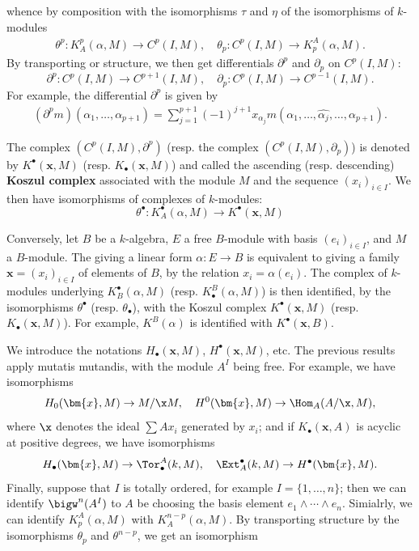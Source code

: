 whence by composition with the isomorphisms $\tau$ and $\eta$ of the isomorphisms of $k$-modules
\begin{align*}
\theta^p:K_A^p(\alpha,M)\to C^p(I,M),\quad \theta_p:C^p(I,M)\to K_p^A(\alpha,M).
\end{align*}
By transporting or structure, we then get differentials $\partial^p$ and $\partial_p$ on $C^p(I,M)$:
\[\partial^p:C^p(I,M)\to C^{p+1}(I,M),\quad \partial_p:C^p(I,M)\to C^{p-1}(I,M).\]
For example, the differential $\partial^p$ is given by
\begin{align}\label{alternating map differential def-1}
(\partial^pm)(\alpha_1,\dots,\alpha_{p+1})=\sum_{j=1}^{p+1}(-1)^{j+1}x_{\alpha_j}m(\alpha_1,\dots,\widehat{\alpha_j},\dots,\alpha_{p+1}).
\end{align}

The complex $(C^p(I,M),\partial^p)$ (resp. the complex $(C^p(I,M),\partial_p)$) is denoted by $K^\bullet(\bm{x},M)$ (resp. $K_\bullet(\bm{x},M)$) and called the ascending (resp. descending) \textbf{Koszul complex} associated with the module $M$ and the sequence $(x_i)_{i\in I}$. We then have isomorphisms of complexes of $k$-modules:
\[\theta^\bullet:K^\bullet_A(\alpha,M)\to K^\bullet(\bm{x},M)\]
\begin{remark}
Conversely, let $B$ be a $k$-algebra, $E$ a free $B$-module with basis $(e_i)_{i\in I}$, and $M$ a $B$-module. The giving a linear form $\alpha:E\to B$ is equivalent to giving a family $\bm{x}=(x_i)_{i\in I}$ of elements of $B$, by the relation $x_i=\alpha(e_i)$. The complex of $k$-modules underlying $K_B^\bullet(\alpha,M)$ (resp. $K_\bullet^B(\alpha,M)$) is then identified, by the isomorphisms $\theta^\bullet$ (resp. $\theta_\bullet$), with the Koszul complex $K^\bullet(\bm{x},M)$ (resp. $K_\bullet(\bm{x},M)$). For example, $K^B(\alpha)$ is identified with $K^\bullet(\bm{x},B)$. 
\end{remark}
We introduce the notations $H_\bullet(\bm{x},M)$, $H^\bullet(\bm{x},M)$, etc. The previous results apply mutatis mutandis, with the module $A^I$ being free. For example, we have isomorphisms
\[H_0(\bm{x},M)\to M/\x M,\quad H^0(\bm{x},M)\to\Hom_A(A/\x,M),\]
where $\x$ denotes the ideal $\sum Ax_i$ generated by $x_i$; and if $K_\bullet(\bm{x},A)$ is acyclic at positive degrees, we have isomorphisms
\[H_\bullet(\bm{x},M)\to\Tor_\bullet^A(k,M),\quad \Ext_A^\bullet(k,M)\to H^\bullet(\bm{x},M).\]
Finally, suppose that $I$ is totally ordered, for example $I=\{1,\dots,n\}$; then we can identify $\bigw^n(A^I)$ to $A$ be choosing the basis element $e_1\wedge\cdots\wedge e_n$. Simialrly, we can identify $K_p^A(\alpha,M)$ with $K_A^{n-p}(\alpha,M)$. By transporting structure by the isomorphisms $\theta_p$ and $\theta^{n-p}$, we get an isomorphism
